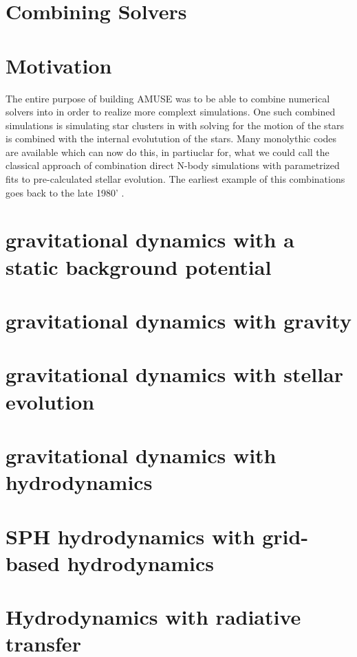 %

        {}

\section{Combining Solvers}\label{Ch:BiphysicsSolvers:Introduction}

\section{Motivation}

The entire purpose of building AMUSE was to be able to combine
numerical solvers into in order to realize more complext simulations.
One such combined simulations is simulating star clusters in with
solving for the motion of the stars is combined with the internal
evolutution of the stars. Many monolythic codes are available which
can now do this, in partiuclar for, what we could call the classical
approach of combination direct N-body simulations with parametrized
fits to pre-calculated stellar evolution. The earliest example of this
combinations goes back to the late 1980' \cite{1987MNRAS.224..193T}.

\section{gravitational dynamics with a static background potential}
\section{gravitational dynamics with gravity}
\section{gravitational dynamics with stellar evolution}
\section{gravitational dynamics with hydrodynamics}
\section{SPH hydrodynamics with grid-based hydrodynamics}
\section{Hydrodynamics with radiative transfer}

%
